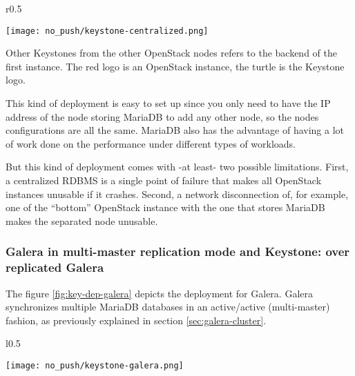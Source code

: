\begin{wrapfigure}{r}{0.5\textwidth}
  \vspace{-20pt}
  \begin{center}
    \texttt{[image: no\_push/keystone-centralized.png]}
  \end{center}
  \vspace{-20pt}
  \caption{Keystone deployment with a centralized MariaDB.}
  \vspace{-15pt}
  \label{fig:key-dep-centralized}
\end{wrapfigure}

 Other Keystones from the other OpenStack nodes refers to the backend of the first instance. The red logo is an OpenStack instance, the turtle is the Keystone logo.

This kind of deployment is easy to set up since you only need to have the IP address of the node storing MariaDB to add any other node, so the nodes configurations are all the same. MariaDB also has the advantage of having a lot of work done on the performance under different types of workloads.

But this kind of deployment comes with -at least- two possible limitations. First, a centralized RDBMS is a single point of failure that makes all OpenStack instances unusable if it crashes. Second, a network disconnection of, for example, one of the ``bottom'' OpenStack instance with the one that stores MariaDB makes the separated node unusable.



\subsubsection{Galera in multi-master replication mode and Keystone: over replicated Galera}
The figure \ref{fig:key-dep-galera} depicts the deployment for Galera. Galera synchronizes multiple MariaDB databases in an active/active (multi-master) fashion, as previously explained in section \ref{sec:galera-cluster}.

\begin{wrapfigure}{l}{0.5\textwidth}
  \vspace{-20pt}
  \begin{center}
    \texttt{[image: no\_push/keystone-galera.png]}
  \end{center}
  \vspace{-20pt}
  \caption{Keystone deployment with synchronized MariaDB instances thanks to Galera.}
  \vspace{-12pt}
  \label{fig:key-dep-galera}
\end{wrapfigure}

